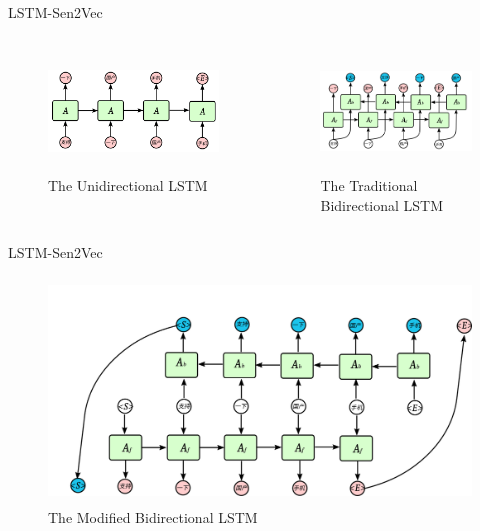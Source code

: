 \documentclass[aspectratio=169]{beamer}
\begin{document}
    \begin{frame}{LSTM-Sen2Vec}
      \begin{columns}
      \begin{column}[t]{0.5\textwidth}
        \begin{figure}
        \includegraphics[width=6.7cm,height=3.2cm]{unilstm.png}
        \caption{The Unidirectional LSTM}
        \end{figure}
      \end{column}

      \begin{column}[t]{0.5\textwidth}
        \begin{figure}
        \includegraphics[width=6cm,height=3.2cm]{bilstm1.png}
        \caption{The Traditional Bidirectional LSTM}
        \end{figure}
      \end{column}

      \end{columns}
    \end{frame}

    \begin{frame}{LSTM-Sen2Vec}
      \begin{figure}
        \includegraphics[width=12cm,height=6cm]{bilstm2.png}
        \caption{The Modified Bidirectional LSTM}
        \end{figure}
    \end{frame}
\end{document}
